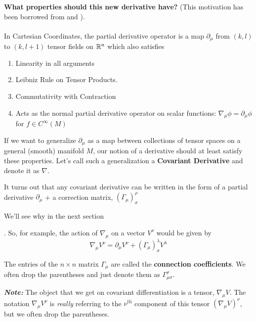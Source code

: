 \documentclass[11pt]{article}
\begin{document}
\begin{bluebox}
  \textbf{What properties should this new derivative have?}
  (This motivation has been borrowed from \cite{Carroll97} and \cite{Wald84}).
  \\
  \\
  In Cartesian Coordinates, the partial derivative operator is a map $\partial_{\mu}$ from $(k,l)$ to $(k, l+1)$ tensor fields on $\mathbb{R}^n$ \cite{Carroll97} which also satisfies 
  \begin{enumerate}
    \item Linearity in all arguments
    \item Leibniz Rule on Tensor Products.
    \item Commutativity with Contraction
    \item Acts as the normal partial derivative operator on scalar functions: 
    $\nabla_{\mu} \phi = \partial_{\mu} \phi$ for $f \in C^{\infty}(M)$
  \end{enumerate}
  If we want to generalize $\partial_{\mu}$ as a map between collections of tensor spaces on a general (smooth) manifold $M$, our notion of a derivative should at least satisfy these properties. Let's call such a generalization a \textbf{Covariant Derivative} and denote it as $\nabla$.
\end{bluebox}

It turns out that any covariant derivative can be written in the form of a partial derivative $\partial_{\mu}$ + a correction matrix, $(\Gamma_{\mu})_{\sigma}^{\rho}$ \begin{thought}{We'll see why in the next section}\end{thought}. So, for example, the action of $\nabla_{\mu}$ on a vector $V^{\nu}$ would be given by
\[  \nabla_{\mu} V^{\nu} = \partial_{\mu} V^{\nu} + (\Gamma_{\mu})_{\sigma}^{\lambda} V^{\lambda} \]

The entries of the $n \times n$ matrix $\Gamma_{\mu}$ are called the \textbf{connection coefficients}. We often drop the parentheses and just denote them as $\Gamma_{\mu \sigma}^{\rho}$.

\begin{redbox}
  \textbf{\emph{Note:}} The object that we get on covariant differentiation is a tensor, $\nabla_{\mu} V$. The notation $\nabla_{\mu} V^{\nu}$ is \emph{really} referring to the $\nu^{\text{th}}$ component of this tensor $(\nabla_{\mu} V)^{\nu}$, but we often drop the parentheses.
\end{redbox}

\end{document}
